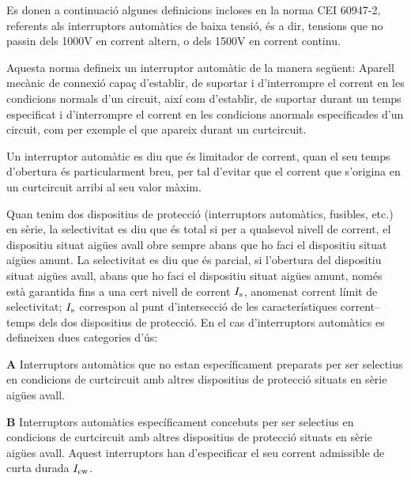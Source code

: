 Es donen a continuació algunes definicions incloses en la norma CEI 60947-2, referents als interruptors automàtics de baixa tensió, és a dir, tensions que no passin dels 1000\unit{V} en corrent altern, o dels 1500\unit{V} en corrent continu.

Aquesta norma defineix un interruptor automàtic de la manera següent: Aparell mecànic de connexió capaç d'establir, de suportar i d'interrompre el corrent en les condicions normals d'un circuit, així com d'establir, de suportar durant un temps especificat i  d'interrompre el corrent en les condicions anormals especificades d'un circuit, com per exemple el que apareix durant un curtcircuit.

Un interruptor automàtic es diu que és limitador de corrent, quan el seu temps d'obertura és particularment breu, per tal d'evitar que el corrent que s'origina en un curtcircuit arribi al seu valor màxim.

Quan tenim dos  dispositius de protecció (interruptors automàtics, fusibles, etc.) en sèrie, la selectivitat es diu que és total si per a qualsevol nivell de corrent, el dispositiu situat aigües avall obre sempre abans que ho faci el dispositiu situat aigües amunt. La selectivitat es diu que és parcial, si l'obertura del dispositiu situat aigües avall, abans que ho faci el dispositiu situat aigües amunt, només està garantida fins a una cert nivell de corrent $I_\mathrm{s}$, anomenat corrent límit de selectivitat; $I_\mathrm{s}$ correspon al punt d'intersecció de les característiques corrent--temps dels dos dispositius de protecció. En el cas d'interruptors automàtics es defineixen dues categories d'ús:
 \begin{list}{}
   {\setlength{\labelwidth}{10mm} \setlength{\leftmargin}{10mm} \setlength{\labelsep}{2mm}}
   \item[\textbf{A}] Interruptors automàtics que no estan específicament preparats per ser selectius en condicions de curtcircuit amb altres dispositius de protecció situats en sèrie  aigües avall.
   \item[\textbf{B}] Interruptors automàtics específicament concebuts per ser selectius en condicions de curtcircuit amb altres dispositius de protecció situats en sèrie  aigües avall. Aquest interruptors han d'especificar el seu corrent admissible de curta durada $I_\mathrm{cw}$.
\end{list}


